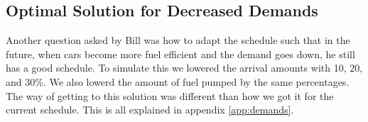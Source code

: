 \subsection{Optimal Solution for Decreased Demands}
Another question asked by Bill was how to adapt the schedule such that in the future, when cars become more fuel efficient and the demand goes down, he still has a good schedule. 
To simulate this we lowered the arrival amounts with 10, 20, and 30\%. We also lowerd the amount of fuel pumped by the same percentages. 
The way of getting to this solution was different than how we got it for the current schedule.
This is all explained in appendix \autoref{app:demands}.